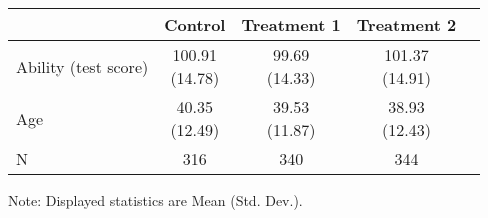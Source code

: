 \renewcommand\cellalign{t}
\begin{threeparttable}
\begin{tabular}{lcccc}
\toprule
 & Control & Treatment 1 & Treatment 2 \\
\midrule
\addlinespace
Ability (test score) & \makecell{100.91\\(14.78)} & \makecell{99.69\\(14.33)} & \makecell{101.37\\(14.91)} \\
Age & \makecell{40.35\\(12.49)} & \makecell{39.53\\(11.87)} & \makecell{38.93\\(12.43)} \\
\midrule
\addlinespace
N & 316 & 340 & 344 \\
\bottomrule
\end{tabular}
\footnotesize Note: Displayed statistics are Mean (Std. Dev.).
\end{threeparttable}